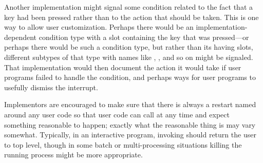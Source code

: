 \begin{defmac}
\begin{sideremark}
    Another implementation might signal some condition related to
    the fact that a key had been pressed rather than to the action that
    should be taken. This is one way to allow user customization.
    Perhaps there would be an implementation-dependent 
    condition type with a slot containing the key that was pressed---or
    perhaps there would be such a condition type, but rather than its having
    slots, different subtypes of that type with names like ,
    , and so on might be signaled. That implementation would
    then document the action it would take if user programs failed
    to handle the condition, and perhaps ways for user programs to
    usefully dismiss the interrupt.
\end{sideremark}
\betweennoterule
\begin{implementation}
  Implementors are encouraged to make sure that there
  is always a restart named  around any user code so that user code 
  can call  at any time and expect something reasonable to happen;
  exactly what the reasonable thing is may vary somewhat. Typically, in an
  interactive program, invoking  should return the user to top level,
  though in some batch or multi-processing situations
  killing the running process might be
  more appropriate.
\end{implementation}
\afternoterule
\end{defmac}


